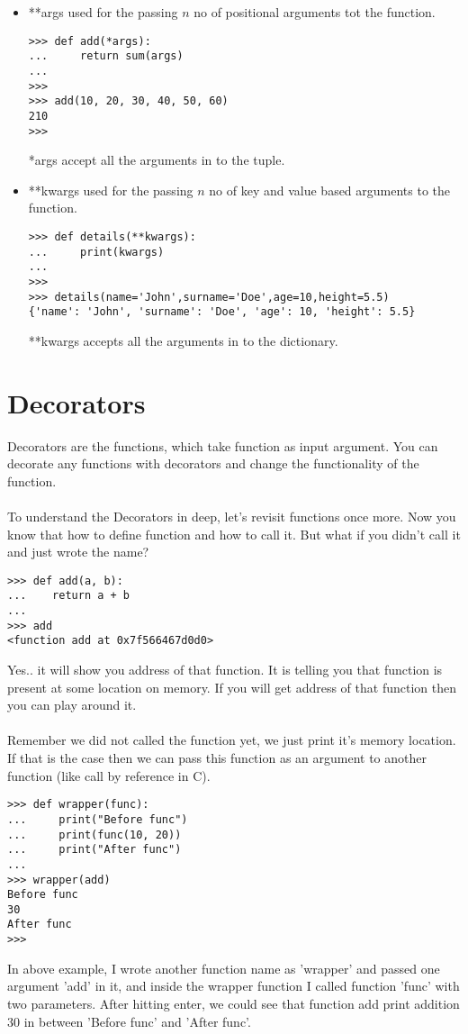 \documentclass[letterpaper,12pt]{book}
\begin{document}
\begin{itemize}
\item **args used for the passing $n$ no of positional arguments tot the function.
\begin{lstlisting}
>>> def add(*args):
...     return sum(args)
... 
>>> 
>>> add(10, 20, 30, 40, 50, 60)
210
>>> 
\end{lstlisting}
*args accept all the arguments in to the tuple.
\item **kwargs used for the passing $n$ no of key and value based arguments to the function.
\begin{lstlisting}
>>> def details(**kwargs):
...     print(kwargs)
... 
>>> 
>>> details(name='John',surname='Doe',age=10,height=5.5)
{'name': 'John', 'surname': 'Doe', 'age': 10, 'height': 5.5}
\end{lstlisting}
**kwargs accepts all the arguments in to the dictionary.
\end{itemize}

\section{Decorators}
Decorators are the functions, which take function as input argument. You can decorate any functions with decorators and change the functionality of the function.
\paragraph{}
To understand the Decorators in deep, let's revisit functions once more. Now you know that how to define function and how to call it. But what if you didn't call it and just wrote the name?
\begin{lstlisting}
>>> def add(a, b):
...    return a + b
...
>>> add
<function add at 0x7f566467d0d0>
\end{lstlisting}

Yes.. it will show you address of that function. It is telling you that function is present at some location on memory. If you will get address of that function then you can play around it.
\paragraph{}
Remember we did not called the function yet, we just print it's memory location. If that is the case then we can pass this function as an argument to another function (like call by reference in C).

\begin{lstlisting}
>>> def wrapper(func):
...     print("Before func")
...     print(func(10, 20))
...     print("After func")
... 
>>> wrapper(add)
Before func
30
After func
>>> 
\end{lstlisting}
In above example, I wrote another function name as 'wrapper' and passed one argument 'add' in it, and inside the wrapper function I called function 'func' with two parameters.
After hitting enter, we could see that function add print addition 30 in between 'Before func' and 'After func'.
\end{document}
